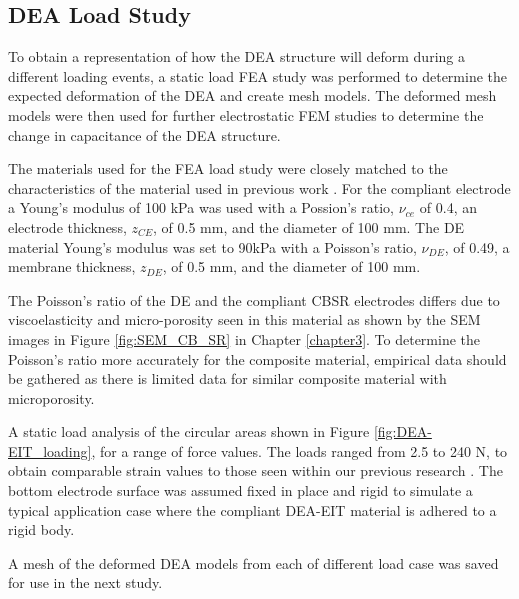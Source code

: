 \subsection{DEA Load Study}
To obtain a representation of how the DEA structure will deform during a different loading events, a static load FEA study was performed to determine the expected deformation of the DEA and create mesh models. The deformed mesh models were then used for further electrostatic FEM studies to determine the change in capacitance of the DEA structure.

The materials used for the FEA load study were closely matched to the characteristics of the material used in previous work \cite{Ellingham2024} . For the compliant electrode a Young's modulus of 100 kPa was used with a Possion's ratio, $\nu_{ce}$ of 0.4, an electrode thickness, $z_{CE}$, of 0.5 mm, and the diameter of 100 mm. The DE material Young's modulus was set to 90kPa with a Poisson's ratio, $\nu_{DE}$, of 0.49, a membrane thickness, $z_{DE}$, of 0.5 mm, and the diameter of 100 mm. 

The Poisson's ratio of the DE and the compliant CBSR electrodes differs due to viscoelasticity and micro-porosity seen in this material as shown by the SEM images in Figure \ref{fig:SEM_CB_SR} in Chapter \ref{chapter3}. To determine the Poisson's ratio more accurately for the composite material, empirical data should be gathered as there is limited data for similar composite material with microporosity.  %

A static load analysis of the circular areas shown in Figure \ref{fig:DEA-EIT_loading}, for a range of force values. The loads ranged from 2.5 to 240 N, to obtain comparable strain values to those seen within our previous research \cite{Ellingham2021,Ellingham2024} . The bottom electrode surface was assumed fixed in place and rigid to simulate a typical application case where the compliant DEA-EIT material is adhered to a rigid body.

A mesh of the deformed DEA models from each of different load case was saved for use in the next study.


